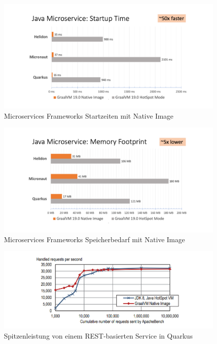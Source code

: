 \newpage
\begin{figure}[h]
	\centering
	\includegraphics[width=.9\textwidth]{resources/ms_startup_time.png}
	\caption{Microservices Frameworks Startzeiten mit Native Image \parencite{GraalVMBenchmarks}}
	\label{fig:system_startuptime}
\end{figure}
\begin{figure}[h]
	\centering
	\includegraphics[width=.9\textwidth]{resources/ms_memory_footprint.png}
	\caption{Microservices Frameworks Speicherbedarf mit Native Image \parencite{GraalVMBenchmarks}}
	\label{fig:system_memory_footprint}
\end{figure}
\begin{figure}[h]
	\centering
	\includegraphics[width=.9\textwidth]{resources/requests_vergleich.png}
	\caption{Spitzenleistung von einem REST-basierten Service in Quarkus \parencite[Fig.12]{Wimmer2019}}
	\label{fig:system_request}
\end{figure}